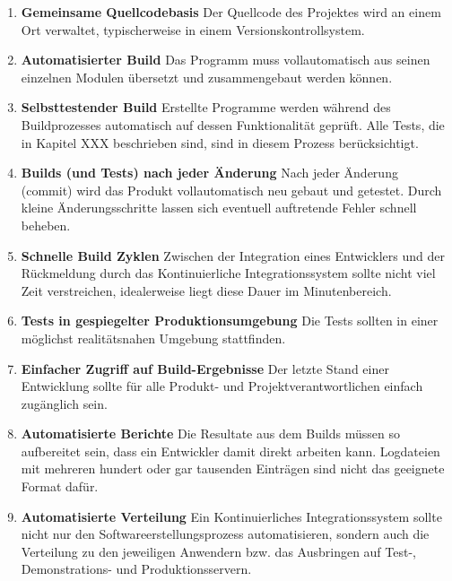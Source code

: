 \begin{enumerate}
	
	\item \textbf{Gemeinsame Quellcodebasis} \newline
	Der Quellcode des Projektes wird an einem Ort verwaltet, typischerweise in einem Versionskontrollsystem.
	
	\item \textbf{Automatisierter Build} \newline
	Das Programm muss vollautomatisch aus seinen einzelnen Modulen übersetzt und zusammengebaut werden können.
	
	\item \textbf{Selbsttestender Build} \newline%
	Erstellte Programme werden während des Buildprozesses automatisch auf dessen Funktionalität geprüft. Alle Tests, die in Kapitel XXX beschrieben sind, sind in diesem Prozess berücksichtigt.
	
	\item \textbf{Builds (und Tests) nach jeder Änderung} \newline
	Nach jeder Änderung (commit) wird das Produkt vollautomatisch neu gebaut und getestet. Durch kleine Änderungsschritte lassen sich eventuell auftretende Fehler schnell beheben.
	
	\item \textbf{Schnelle Build Zyklen} \newline
	Zwischen der Integration eines Entwicklers und der Rückmeldung durch das Kontinuierliche Integrationssystem sollte nicht viel Zeit verstreichen, idealerweise liegt diese Dauer im Minutenbereich.
	
	\item \textbf{Tests in gespiegelter Produktionsumgebung} \newline
	Die Tests sollten in einer möglichst realitätsnahen Umgebung stattfinden.
	
	\item \textbf{Einfacher Zugriff auf Build-Ergebnisse} \newline
	Der letzte Stand einer Entwicklung sollte für alle Produkt- und Projektverantwortlichen einfach zugänglich sein.
	
	\item \textbf{Automatisierte Berichte} \newline
	Die Resultate aus dem Builds müssen so aufbereitet sein, dass ein Entwickler damit direkt arbeiten kann. Logdateien mit mehreren hundert oder gar tausenden Einträgen sind nicht das geeignete Format dafür.
	
	\item \textbf{Automatisierte Verteilung} \newline
	Ein Kontinuierliches Integrationssystem sollte nicht nur den Softwareerstellungsprozess automatisieren, sondern auch die Verteilung zu den jeweiligen Anwendern bzw. das Ausbringen auf Test-, Demonstrations- und Produktionsservern. 
\end{enumerate}

